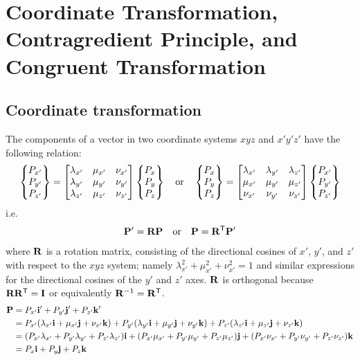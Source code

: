 \chapter[Coordinate Transformation]{Coordinate Transformation, Contragredient Principle, and Congruent Transformation}
\label{ch:transform}

\section{Coordinate transformation}
\begin{fig}
  
\end{fig}
The components of a vector in two coordinate systems $xyz$ and $x'y'z'$ have the following relation:
\begin{equation}
  \begin{Bmatrix}P_{x'}\\ P_{y'}\\ P_{z'}\end{Bmatrix} = \begin{bmatrix}\lambda_{x'} & \mu_{x'} & \nu_{x'}\\ \lambda_{y'} & \mu_{y'} & \nu_{y'}\\ \lambda_{z'} & \mu_{z'} & \nu_{z'}\end{bmatrix}\begin{Bmatrix}P_x\\ P_y\\ P_z\end{Bmatrix}
  \quad\text{or}\quad
  \begin{Bmatrix}P_x\\ P_y\\ P_z\end{Bmatrix} = \begin{bmatrix}\lambda_{x'} & \lambda_{y'} & \lambda_{z'}\\ \mu_{x'} & \mu_{y'} & \mu_{z'}\\ \nu_{x'} & \nu_{y'} & \nu_{z'}\end{bmatrix}\begin{Bmatrix}P_{x'}\\ P_{y'}\\ P_{z'}\end{Bmatrix}
\end{equation}
i.e.
\begin{equation}
  \mathbf{P}' = \mathbf{R}\mathbf{P} \quad\text{or}\quad \mathbf{P} = \mathbf{R}^{\mathsf{T}}\mathbf{P}'
\end{equation}
where $\mathbf{R}$ is a rotation matrix, consisting of the directional cosines of $x'$, $y'$, and $z'$ with respect to the $xyz$ system; namely $\lambda_{x'}^2+\mu_{x'}^2+\nu_{x'}^2 = 1$ and similar expressions for the directional cosines of the $y'$ and $z'$ axes. $\mathbf{R}$ is orthogonal because $\mathbf{R}\mathbf{R}^{\mathsf{T}} = \mathbf{I}$ or equivalently $\mathbf{R}^{-1} = \mathbf{R}^{\mathsf{T}}$.
\begin{equation}
  \begin{aligned}
    \mathbf{P} &= P_{x'}\mathbf{i}' + P_{y'}\mathbf{j}' + P_{z'}\mathbf{k}'\\
          &= P_{x'}(\lambda_{x'}\mathbf{i}+\mu_{x'}\mathbf{j}+\nu_{x'}\mathbf{k}) + P_{y'}(\lambda_{y'}\mathbf{i}+\mu_{y'}\mathbf{j}+\nu_{y'}\mathbf{k}) + P_{z'}(\lambda_{z'}\mathbf{i}+\mu_{z'}\mathbf{j}+\nu_{z'}\mathbf{k})\\
          &= (P_{x'}\lambda_{x'}+P_{y'}\lambda_{y'}+P_{z'}\lambda_{z'})\mathbf{i} + (P_{x'}\mu_{x'}+P_{y'}\mu_{y'}+P_{z'}\mu_{z'})\mathbf{j} + (P_{x'}\nu_{x'}+P_{y'}\nu_{y'}+P_{z'}\nu_{z'})\mathbf{k}\\
          &= P_x\mathbf{i} + P_y\mathbf{j} + P_z\mathbf{k}
  \end{aligned}
\end{equation}
